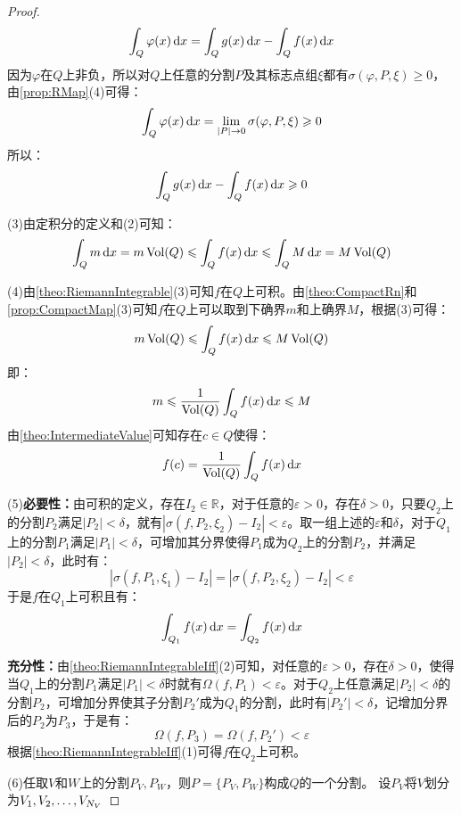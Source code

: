 \begin{proof}
	\begin{equation*}
		\int_Q\varphi(x)\mathop{}\!\mathrm{d} x=\int_Qg(x)\mathop{}\!\mathrm{d} x-\int_Qf(x)\mathop{}\!\mathrm{d} x
	\end{equation*}
	因为$\varphi$在$Q$上非负，所以对$Q$上任意的分割$P$及其标志点组$\xi$都有$\sigma(\varphi,P,\xi)\geqslant0$，由\cref{prop:RMap}(4)可得：
	\begin{equation*}
		\int_Q\varphi(x)\mathop{}\!\mathrm{d} x=\lim_{|P|\to0}\sigma(\varphi,P,\xi)\geqslant0
	\end{equation*}
	所以：
	\begin{equation*}
		\int_Qg(x)\mathop{}\!\mathrm{d} x-\int_Qf(x)\mathop{}\!\mathrm{d} x\geqslant0
	\end{equation*}\par
	(3)由定积分的定义和(2)可知：
	\begin{equation*}
		\int_Qm\mathop{}\!\mathrm{d} x=m\operatorname{Vol}(Q)\leqslant\int_Qf(x)\mathop{}\!\mathrm{d} x\leqslant\int_QM\mathop{}\!\mathrm{d} x=M\operatorname{Vol}(Q)
	\end{equation*}\par
	(4)由\cref{theo:RiemannIntegrable}(3)可知$f$在$Q$上可积。由\cref{theo:CompactRn}和\cref{prop:CompactMap}(3)可知$f$在$Q$上可以取到下确界$m$和上确界$M$，根据(3)可得：
	\begin{equation*}
		m\operatorname{Vol}(Q)\leqslant\int_Qf(x)\mathop{}\!\mathrm{d} x\leqslant M\operatorname{Vol}(Q)
	\end{equation*}
	即：
	\begin{equation*}
		m\leqslant\frac{1}{\operatorname{Vol}(Q)}\int_Qf(x)\mathop{}\!\mathrm{d} x\leqslant M
	\end{equation*}
	由\cref{theo:IntermediateValue}可知存在$c\in Q$使得：
	\begin{equation*}
		f(c)=\frac{1}{\operatorname{Vol}(Q)}\int_Qf(x)\mathop{}\!\mathrm{d} x
	\end{equation*}\par
	(5)\textbf{必要性：}由可积的定义，存在$I_2\in\mathbb{R}$，对于任意的$\varepsilon>0$，存在$\delta>0$，只要$Q_2$上的分割$P_2$满足$|P_2|<\delta$，就有$|\sigma(f,P_2,\xi_2)-I_2|<\varepsilon$。取一组上述的$\varepsilon$和$\delta$，对于$Q_1$上的分割$P_1$满足$|P_1|<\delta$，可增加其分界使得$P_1$成为$Q_2$上的分割$P_2$，并满足$|P_2|<\delta$，此时有：
	\begin{equation*}
		|\sigma(f,P_1,\xi_1)-I_2|=|\sigma(f,P_2,\xi_2)-I_2|<\varepsilon
	\end{equation*}
	于是$f$在$Q_1$上可积且有：
	\begin{equation*}
		\int_{Q_1}f(x)\mathop{}\!\mathrm{d} x=\int_{Q_2}f(x)\mathop{}\!\mathrm{d} x
	\end{equation*}\par
	\textbf{充分性：}由\cref{theo:RiemannIntegrableIff}(2)可知，对任意的$\varepsilon>0$，存在$\delta>0$，使得当$Q_1$上的分割$P_1$满足$|P_1|<\delta$时就有$\Omega(f,P_1)<\varepsilon$。对于$Q_2$上任意满足$|P_2|<\delta$的分割$P_2$，可增加分界使其子分割$P_2'$成为$Q_1$的分割，此时有$|P_2'|<\delta$，记增加分界后的$P_2$为$P_3$，于是有：
	\begin{equation*}
		\Omega(f,P_3)=\Omega(f,P_2')<\varepsilon
	\end{equation*}
	根据\cref{theo:RiemannIntegrableIff}(1)可得$f$在$Q_2$上可积。\par
	(6)任取$V$和$W$上的分割$P_V,P_W$，则$P=\{P_V,P_W\}$构成$Q$的一个分割。 设$P_V$将$V$划分为$V_1, V_2, \dots, V_{N_V}$
\end{proof}
